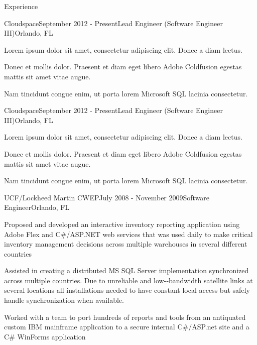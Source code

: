\documentclass{resume} %
\begin{document}
\begin{rSection}{Experience}

\begin{rSubsection}{Cloudspace}{September 2012 - Present}{Lead Engineer (Software Engineer III)}{Orlando, FL}

\item Lorem ipsum dolor sit amet, consectetur adipiscing elit. Donec a diam lectus.
\item Donec et mollis dolor. Praesent et diam eget libero Adobe Coldfusion egestas mattis sit amet vitae augue.
\item Nam tincidunt congue enim, ut porta lorem Microsoft SQL lacinia consectetur.

\end{rSubsection}


\begin{rSubsection}{Cloudspace}{September 2012 - Present}{Lead Engineer (Software Engineer III)}{Orlando, FL}

\item Lorem ipsum dolor sit amet, consectetur adipiscing elit. Donec a diam lectus.
\item Donec et mollis dolor. Praesent et diam eget libero Adobe Coldfusion egestas mattis sit amet vitae augue.
\item Nam tincidunt congue enim, ut porta lorem Microsoft SQL lacinia consectetur.

\end{rSubsection}


\begin{rSubsection}{UCF/Lockheed Martin CWEP}{July 2008 - November 2009}{Software Engineer}{Orlando, FL}

\item Proposed and developed an interactive inventory reporting application using Adobe Flex and  C\#/ASP.NET web services that was used daily to make critical inventory management decisions across multiple warehouses in several different countries 
\item Assisted in creating a distributed MS SQL Server implementation synchronized across multiple countries.  Due to unreliable and low-­‐bandwidth satellite links at several locations all installations needed to have constant local access but safely handle synchronization when available. 
\item Worked with a team to port hundreds of reports and tools from an antiquated custom IBM mainframe application to a secure internal C\#/ASP.net site and a C\# WinForms application 

\end{rSubsection}


\end{rSection}
\end{document}
